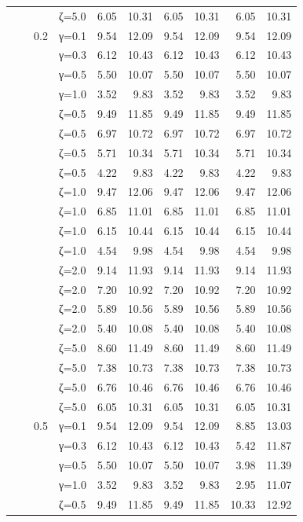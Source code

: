 \begin{table}[htbp]
\begin{tabular}{ll r l  rr  rr  rr}
  &  &  & ζ=5.0 & 6.05 & 10.31 & 6.05 & 10.31 & 6.05 & 10.31 \\
  &  & 0.2 & γ=0.1 & 9.54 & 12.09 & 9.54 & 12.09 & 9.54 & 12.09 \\
  &  &  & γ=0.3 & 6.12 & 10.43 & 6.12 & 10.43 & 6.12 & 10.43 \\
  &  &  & γ=0.5 & 5.50 & 10.07 & 5.50 & 10.07 & 5.50 & 10.07 \\
  &  &  & γ=1.0 & 3.52 & 9.83 & 3.52 & 9.83 & 3.52 & 9.83 \\
  &  &  & ζ=0.5 & 9.49 & 11.85 & 9.49 & 11.85 & 9.49 & 11.85 \\
  &  &  & ζ=0.5 & 6.97 & 10.72 & 6.97 & 10.72 & 6.97 & 10.72 \\
  &  &  & ζ=0.5 & 5.71 & 10.34 & 5.71 & 10.34 & 5.71 & 10.34 \\
  &  &  & ζ=0.5 & 4.22 & 9.83 & 4.22 & 9.83 & 4.22 & 9.83 \\
  &  &  & ζ=1.0 & 9.47 & 12.06 & 9.47 & 12.06 & 9.47 & 12.06 \\
  &  &  & ζ=1.0 & 6.85 & 11.01 & 6.85 & 11.01 & 6.85 & 11.01 \\
  &  &  & ζ=1.0 & 6.15 & 10.44 & 6.15 & 10.44 & 6.15 & 10.44 \\
  &  &  & ζ=1.0 & 4.54 & 9.98 & 4.54 & 9.98 & 4.54 & 9.98 \\
  &  &  & ζ=2.0 & 9.14 & 11.93 & 9.14 & 11.93 & 9.14 & 11.93 \\
  &  &  & ζ=2.0 & 7.20 & 10.92 & 7.20 & 10.92 & 7.20 & 10.92 \\
  &  &  & ζ=2.0 & 5.89 & 10.56 & 5.89 & 10.56 & 5.89 & 10.56 \\
  &  &  & ζ=2.0 & 5.40 & 10.08 & 5.40 & 10.08 & 5.40 & 10.08 \\
  &  &  & ζ=5.0 & 8.60 & 11.49 & 8.60 & 11.49 & 8.60 & 11.49 \\
  &  &  & ζ=5.0 & 7.38 & 10.73 & 7.38 & 10.73 & 7.38 & 10.73 \\
  &  &  & ζ=5.0 & 6.76 & 10.46 & 6.76 & 10.46 & 6.76 & 10.46 \\
  &  &  & ζ=5.0 & 6.05 & 10.31 & 6.05 & 10.31 & 6.05 & 10.31 \\
  &  & 0.5 & γ=0.1 & 9.54 & 12.09 & 9.54 & 12.09 & 8.85 & 13.03 \\
  &  &  & γ=0.3 & 6.12 & 10.43 & 6.12 & 10.43 & 5.42 & 11.87 \\
  &  &  & γ=0.5 & 5.50 & 10.07 & 5.50 & 10.07 & 3.98 & 11.39 \\
  &  &  & γ=1.0 & 3.52 & 9.83 & 3.52 & 9.83 & 2.95 & 11.07 \\
  &  &  & ζ=0.5 & 9.49 & 11.85 & 9.49 & 11.85 & 10.33 & 12.92 \\

\end{tabular}
\end{table}
